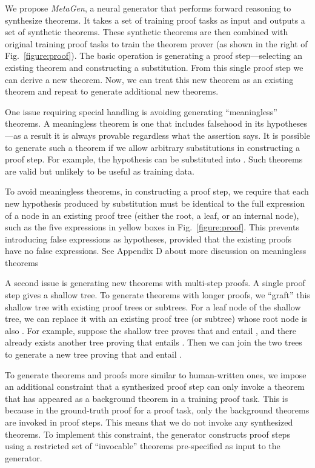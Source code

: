 \documentclass{article}
\begin{document}
We propose \emph{MetaGen}, a neural generator that performs forward reasoning to  synthesize theorems. 
It takes a set of training proof tasks as input and outputs a set of synthetic theorems. These synthetic theorems are then combined with original training proof tasks to train the theorem prover (as shown in the right of Fig.~\ref{figure:proof}). The basic operation is generating a proof step---selecting an existing theorem and constructing a substitution. From this single proof step we can derive a new theorem. Now, we can treat this new theorem as an existing theorem and repeat to generate additional new theorems. 

One issue requiring special handling is avoiding generating ``meaningless'' theorems. A meaningless theorem is one that includes falsehood in its hypotheses---as a result it is always provable regardless what the assertion says. It is possible to generate such a theorem if we allow arbitrary substitutions in constructing a proof step. For example, the hypothesis  can be substituted into 
. Such theorems are valid but unlikely to be useful as training data. 

To avoid meaningless theorems, in constructing a proof step, we require that each new hypothesis produced by substitution must be identical to the full expression of a node in an existing proof tree  (either the root, a leaf, or an internal node), such as the five expressions in yellow boxes in Fig.~\ref{figure:proof}. This prevents introducing false expressions as hypotheses, provided that the existing proofs have no false expressions. See Appendix D about more discussion on meaningless theorems 

A second issue is generating new theorems with multi-step proofs. A single proof step gives a shallow tree. 
To generate theorems with longer proofs, we ``graft'' this shallow tree with existing proof trees or subtrees. For a leaf node  of the shallow tree,  we can replace it with an existing proof tree (or subtree) whose root node is also . For example, suppose the shallow tree proves that  and  entail , and there already exists another tree proving that  entails . Then we can join the two trees to generate a new tree proving that  and  entail . 

To generate theorems and proofs more similar to human-written ones, we impose an additional constraint that a synthesized proof step can only invoke a theorem that has appeared as a background theorem in a training proof task. This is because in the ground-truth proof for a proof task, only the background theorems are invoked in proof steps.  This means that we do not invoke any synthesized theorems. To implement this constraint, the generator constructs proof steps using a restricted set of ``invocable'' theorems pre-specified as input to the generator. 
\end{document}
